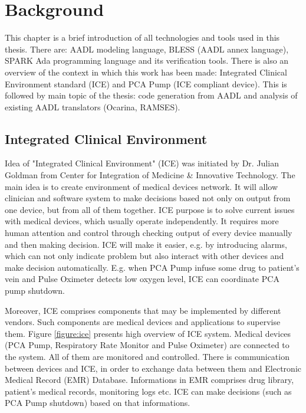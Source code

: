 
\cleardoublepage


\chapter{Background}
\label{background}

This chapter is a brief introduction of all technologies and tools used in this thesis. There are: AADL modeling language, BLESS (AADL annex language), SPARK Ada programming language and its verification tools. There is also an overview of the context in which this work has been made: Integrated Clinical Environment standard (ICE) and PCA Pump (ICE compliant device). This is followed by main topic of the thesis: code generation from AADL and analysis of existing AADL translators (Ocarina, RAMSES).



\section{Integrated Clinical Environment}
\label{background:ice}

Idea of "Integrated Clinical Environment" (ICE) was initiated by Dr. Julian Goldman from Center for Integration of Medicine \& Innovative Technology. The main idea is to create environment of medical devices network. It will allow clinician and software system to make decisions based not only on output from one device, but from all of them together. ICE purpose is to solve current issues with medical devices, which usually operate independently. It requires more human attention and control through checking output of every device manually and then making decision. ICE will make it easier, e.g. by introducing alarms, which can not only indicate problem but also interact with other devices and make decision automatically. E.g. when PCA Pump infuse some drug to patient's vein and Pulse Oximeter detects low oxygen level, ICE can coordinate PCA pump shutdown.

Moreover, ICE comprises components that may be implemented by different vendors. Such components are medical devices and applications to supervise them. Figure \ref{figure:ice} presents high overview of ICE system. Medical devices (PCA Pump, Respiratory Rate Monitor and Pulse Oximeter) are connected to the system. All of them are monitored and controlled. There is communication between devices and ICE, in order to exchange data between them and Electronic Medical Record (EMR) Database. Informations in EMR comprises drug library, patient's medical records, monitoring logs etc. ICE can make decisions (such as PCA Pump shutdown) based on that informations.

